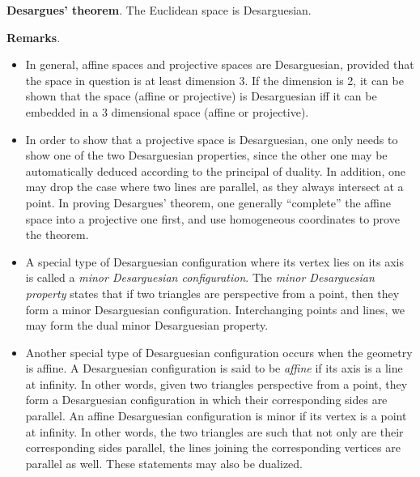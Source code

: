 \documentclass[12pt]{article}
\begin{document}
\textbf{Desargues' theorem}.  The Euclidean space is Desarguesian.

\textbf{Remarks}.  
\begin{itemize}
\item In general, affine spaces and projective spaces are Desarguesian, provided that the space in question is at least dimension 3.  If the dimension is 2, it can be shown that the space (affine or projective) is Desarguesian iff it can be embedded in a 3 dimensional space (affine or projective).
\item In order to show that a projective space is Desarguesian, one only needs to show one of the two Desarguesian properties, since the other one may be automatically deduced according to the principal of duality.  In addition, one may drop the case where two lines are parallel, as they always intersect at a point.  In proving Desargues' theorem, one generally ``complete'' the affine space into a projective one first, and use homogeneous coordinates to prove the theorem.
\item A special type of Desarguesian configuration where its vertex lies on its axis is called a \emph{minor Desarguesian configuration}.  The \emph{minor Desarguesian property} states that if two triangles are perspective from a point, then they form a minor Desarguesian configuration.  Interchanging points and lines, we may form the dual minor Desarguesian property.
\item Another special type of Desarguesian configuration occurs when the geometry is affine.  A Desarguesian configuration is said to be \emph{affine} if its axis is a line at infinity.  In other words, given two triangles perspective from a point, they form a Desarguesian configuration in which their corresponding sides are parallel.  An affine Desarguesian configuration is minor if its vertex is a point at infinity.  In other words, the two triangles are such that not only are their corresponding sides parallel, the lines joining the corresponding vertices are parallel as well.  These statements may also be dualized.
\end{itemize}
\end{document}
